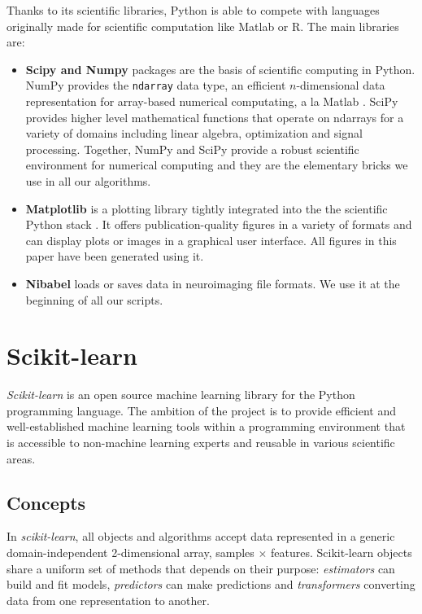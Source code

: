 \documentclass{frontiersSCNS} %
\begin{document}
Thanks to its scientific libraries, Python is able to compete with languages
originally made for scientific computation like Matlab or R. The main libraries
are:
\begin{itemize}
    \item{\bf Scipy and Numpy} packages are the basis of scientific computing in Python.
        NumPy provides the \verb!ndarray! data type, an efficient $n$-dimensional data
        representation for array-based numerical computating, a la Matlab
        \citep{vanderwalt2011}.
        SciPy provides higher level mathematical functions that operate on ndarrays for
        a variety of domains including linear algebra, optimization and signal
        processing. Together, NumPy and SciPy provide a robust scientific environment
        for numerical computing and they are the elementary bricks we use in all our
        algorithms.

    \item{\bf Matplotlib} is a plotting library tightly integrated into the
        the scientific Python stack \citep{hunter2007}. It offers publication-quality figures in
        a variety of formats and can display plots or images in a
        graphical user interface. All figures in this paper have been generated using
        it.

    \item{\bf Nibabel} loads or saves data in neuroimaging file formats.
	We use it at the beginning of all our scripts.
\end{itemize}

\section{Scikit-learn}
\label{scikitlearn}

{\em Scikit-learn} \citep{pedregosa2011} is an open source machine
learning library for the Python programming language. The ambition of the
project is to provide efficient and well-established machine learning tools within
a programming environment that is accessible to non-machine learning experts
and reusable in various scientific areas.

\subsection{Concepts}

In {\em scikit-learn}, all objects and algorithms accept data represented
in a generic domain-independent 2-dimensional array, samples $\times$
features. Scikit-learn objects share a uniform set of methods that
depends on their purpose: \textit{estimators} can build and fit models,
\textit{predictors} can make predictions and \textit{transformers}
converting data from one representation to another.
\end{document}
